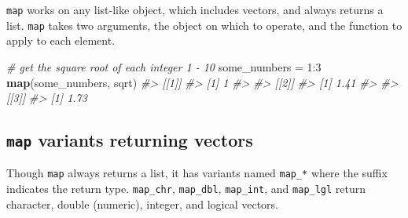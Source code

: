 \documentclass[]{book}
\newenvironment{Shaded}{}{}
\newcommand{\CommentTok}[1]{\textcolor[rgb]{0.38,0.63,0.69}{\textit{#1}}}
\newcommand{\DecValTok}[1]{\textcolor[rgb]{0.25,0.63,0.44}{#1}}
\newcommand{\KeywordTok}[1]{\textcolor[rgb]{0.00,0.44,0.13}{\textbf{#1}}}
\newcommand{\NormalTok}[1]{#1}
\newcommand{\OperatorTok}[1]{\textcolor[rgb]{0.40,0.40,0.40}{#1}}
\newcommand{\StringTok}[1]{\textcolor[rgb]{0.25,0.44,0.63}{#1}}
\begin{document}
\texttt{map} works on any list-like object, which includes vectors, and always returns a list. \texttt{map} takes two arguments, the object on which to operate, and the function to apply to each element.

\begin{Shaded}
\begin{Highlighting}[]
\CommentTok{# get the square root of each integer 1 - 10}
\NormalTok{some_numbers =}\StringTok{ }\DecValTok{1}\OperatorTok{:}\DecValTok{3}
\KeywordTok{map}\NormalTok{(some_numbers, sqrt)}
\CommentTok{#> [[1]]}
\CommentTok{#> [1] 1}
\CommentTok{#> }
\CommentTok{#> [[2]]}
\CommentTok{#> [1] 1.41}
\CommentTok{#> }
\CommentTok{#> [[3]]}
\CommentTok{#> [1] 1.73}
\end{Highlighting}
\end{Shaded}

\hypertarget{map-variants-returning-vectors}{%
\subsection{\texorpdfstring{\texttt{map} variants returning vectors}{map variants returning vectors}}\label{map-variants-returning-vectors}}

Though \texttt{map} always returns a list, it has variants named \texttt{map\_*} where the suffix indicates the return type.
\texttt{map\_chr}, \texttt{map\_dbl}, \texttt{map\_int}, and \texttt{map\_lgl} return character, double (numeric), integer, and logical vectors.
\end{document}
